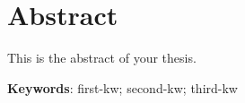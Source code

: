 \chapter*{Abstract}
\label{chap::abstract}
This is the abstract of your thesis.

\noindent \textbf{Keywords}: first-kw; second-kw; third-kw

\newpage